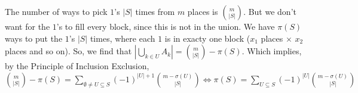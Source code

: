 \begin{enumerate}
 The number of ways to pick $1$'s $|S|$ times from $m$ places is $\binom{m}{|S|}$. But we don't want for the $1$'s to fill every block, since this is not in the union. We have $\pi(S)$ ways to put the $1$'s $|S|$ times, where each $1$ is in exacty one block ($x_1$ places $\times$ $x_2$ places and so on). So, we find that $| \bigcup_{k \in U}A_k | = \binom{m}{|S|}-\pi(S)$. Which implies, by the Principle of Inclusion Exclusion, $\binom{m}{|S|}-\pi(S) = \sum_{\emptyset \neq U \subseteq S} (-1)^{|U|+1}\binom{m- \sigma(U)}{|S|} \iff \pi(S) = \sum_{U \subseteq S} (-1)^{|U|}\binom{m- \sigma(U)}{|S|}$



\end{enumerate}